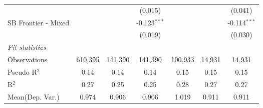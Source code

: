 \begin{tabular}{lcccccc}
                        &               &               & (0.015)        &               &               & (0.041)\\   
   SB Frontier - Mixed  &               &               & -0.123$^{***}$ &               &               & -0.114$^{***}$\\   
                        &               &               & (0.019)        &               &               & (0.030)\\   
   \midrule
   \emph{Fit statistics}\\
   Observations         & 610,395       & 141,390       & 141,390        & 100,933       & 14,931        & 14,931\\  
   Pseudo R$^2$         & 0.14          & 0.14          & 0.14           & 0.15          & 0.15          & 0.15\\  
   R$^2$                & 0.27          & 0.25          & 0.25           & 0.28          & 0.27          & 0.27\\  
Mean(Dep. Var.) & 0.974 & 0.906 & 0.906 & 1.019 & 0.911 & 0.911 \\
   

\end{tabular}
